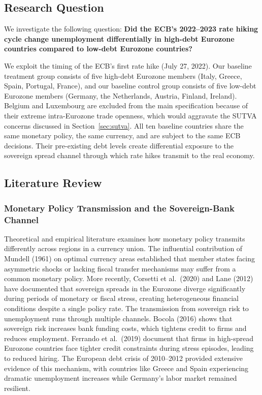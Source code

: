 \documentclass[11pt,a4paper]{article}
\begin{document}
\subsection{Research Question}

We investigate the following question: \textbf{Did the ECB's 2022--2023 rate hiking cycle change unemployment differentially in high-debt Eurozone countries compared to low-debt Eurozone countries?}

We exploit the timing of the ECB's first rate hike (July 27, 2022). Our baseline treatment group consists of five high-debt Eurozone members (Italy, Greece, Spain, Portugal, France), and our baseline control group consists of five low-debt Eurozone members (Germany, the Netherlands, Austria, Finland, Ireland). Belgium and Luxembourg are excluded from the main specification because of their extreme intra-Eurozone trade openness, which would aggravate the SUTVA concerns discussed in Section~\ref{sec:sutva}. All ten baseline countries share the same monetary policy, the same currency, and are subject to the same ECB decisions. Their pre-existing debt levels create differential exposure to the sovereign spread channel through which rate hikes transmit to the real economy.

\subsection{Literature Review}
\subsubsection{Monetary Policy Transmission and the Sovereign-Bank Channel}
Theoretical and empirical literature examines how monetary policy transmits differently
across regions in a currency union. The influential contribution of Mundell (1961) on
optimal currency areas established that member states facing asymmetric shocks or lacking
fiscal transfer mechanisms may suffer from a common monetary policy. More recently,
Corsetti et al.\ (2020) and Lane (2012) have documented that sovereign spreads in the
Eurozone diverge significantly during periods of monetary or fiscal stress, creating
heterogeneous financial conditions despite a single policy rate. The transmission from
sovereign risk to unemployment runs through multiple channels. Bocola (2016) shows
that sovereign risk increases bank funding costs, which tightens credit to firms and
reduces employment. Ferrando et al.\ (2019) document that firms in high-spread Eurozone
countries face tighter credit constraints during stress episodes, leading to reduced hiring.
The European debt crisis of 2010--2012 provided extensive evidence of this mechanism,
with countries like Greece and Spain experiencing dramatic unemployment increases while
Germany's labor market remained resilient.
\end{document}
